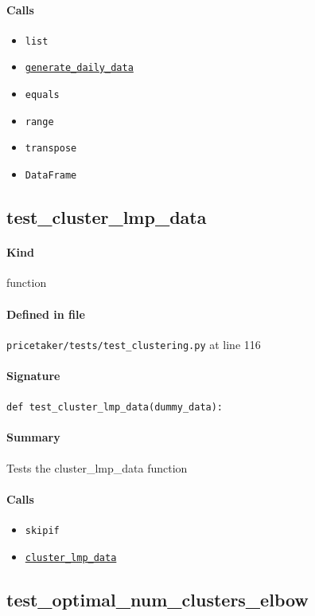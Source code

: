 \documentclass[11pt]{report}
\begin{document}
\paragraph{Calls}
\begin{itemize}[leftmargin=*]
  \item \texttt{list}
  \item \hyperref[def:pricetaker-clustering.py:generate_daily_data:L35]{\texttt{generate\_daily\_data}}
  \item \texttt{equals}
  \item \texttt{range}
  \item \texttt{transpose}
  \item \texttt{DataFrame}
\end{itemize}
\subsection{test\_cluster\_lmp\_data}
\label{def:pricetaker-tests-test_clustering.py:test_cluster_lmp_data:L116}
\paragraph{Kind} function
\paragraph{Defined in file} \texttt{pricetaker/tests/test\_clustering.py} at line 116
\paragraph{Signature} \texttt{def test\_cluster\_lmp\_data(dummy\_data):}
\paragraph{Summary} Tests the cluster\_lmp\_data function
\paragraph{Calls}
\begin{itemize}[leftmargin=*]
  \item \texttt{skipif}
  \item \hyperref[def:pricetaker-clustering.py:cluster_lmp_data:L76]{\texttt{cluster\_lmp\_data}}
\end{itemize}
\subsection{test\_optimal\_num\_clusters\_elbow}
\label{def:pricetaker-tests-test_clustering.py:test_optimal_num_clusters_elbow:L134}
\end{document}
